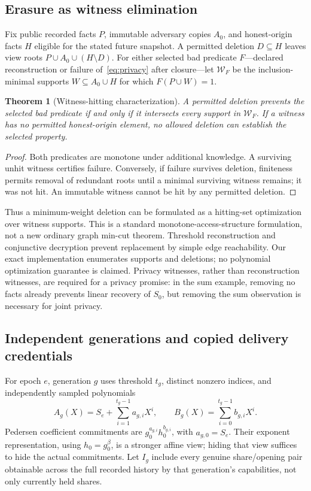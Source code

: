 \documentclass[pdflatex,sn-mathphys-num]{sn-jnl}
\theoremstyle{plain}
\newtheorem{theorem}{Theorem}
\theoremstyle{definition}
\begin{document}
\subsection{Erasure as witness elimination}
Fix public recorded facts $P$, immutable adversary copies $A_0$, and honest-origin facts $H$ eligible for the stated future snapshot. A permitted deletion $D\subseteq H$ leaves view roots $P\cup A_0\cup(H\setminus D)$. For either selected bad predicate $F$---declared reconstruction or failure of~\eqref{eq:privacy} after closure---let $\mathcal W_F$ be the inclusion-minimal supports $W\subseteq A_0\cup H$ for which $F(P\cup W)=1$.

\begin{theorem}[Witness-hitting characterization]\label{thm:cuts}
A permitted deletion prevents the selected bad predicate if and only if it intersects every support in $\mathcal W_F$. If a witness has no permitted honest-origin element, no allowed deletion can establish the selected property.
\end{theorem}
\begin{proof}
Both predicates are monotone under additional knowledge. A surviving unhit witness certifies failure. Conversely, if failure survives deletion, finiteness permits removal of redundant roots until a minimal surviving witness remains; it was not hit. An immutable witness cannot be hit by any permitted deletion.
\end{proof}

Thus a minimum-weight deletion can be formulated as a hitting-set optimization over witness supports. This is a standard monotone-access-structure formulation, not a new ordinary graph min-cut theorem. Threshold reconstruction and conjunctive decryption prevent replacement by simple edge reachability. Our exact implementation enumerates supports and deletions; no polynomial optimization guarantee is claimed. Privacy witnesses, rather than reconstruction witnesses, are required for a privacy promise: in the sum example, removing no facts already prevents linear recovery of $S_0$, but removing the sum observation is necessary for joint privacy.

\subsection{Independent generations and copied delivery credentials}
For epoch $e$, generation $g$ uses threshold $t_g$, distinct nonzero indices, and independently sampled polynomials
\begin{equation}\label{eq:sharing}
 A_g(X)=S_e+\sum_{i=1}^{t_g-1}a_{g,i}X^i,
 \qquad B_g(X)=\sum_{i=0}^{t_g-1}b_{g,i}X^i.
\end{equation}
Pedersen coefficient commitments are $g_0^{a_{g,i}}h_0^{b_{g,i}}$, with $a_{g,0}=S_e$. Their exponent representation, using $h_0=g_0^\beta$, is a stronger affine view; hiding that view suffices to hide the actual commitments. Let $I_g$ include every genuine share/opening pair obtainable across the full recorded history by that generation's capabilities, not only currently held shares.
\end{document}
